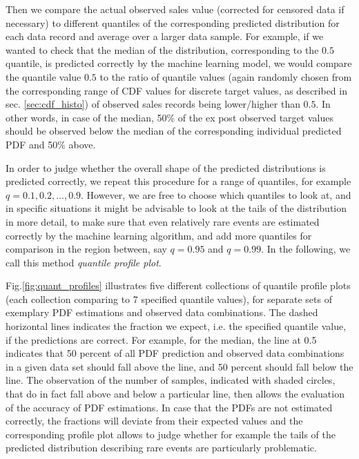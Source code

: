\documentclass[BCOR=1mm, DIV=calc,10pt,
twoside=true,
twocolumn,
headings=normal]{scrartcl}
\newcommand{\fig}{Fig.}
\begin{document}
Then we compare the actual observed sales value (corrected for censored data if necessary) to different quantiles of the corresponding predicted distribution for each data record and average over a larger data sample. For example, if we wanted to check that the median of the distribution, corresponding to the $0.5$ quantile, is predicted correctly by the machine learning model, we would compare the quantile value $0.5$ to the ratio of quantile values (again randomly chosen from the corresponding range of CDF values for discrete target values, as described in sec. \ref{sec:cdf_histo}) of observed sales records being lower/higher than $0.5$. In other words, in case of the median, 50\% of the ex post observed target values should be observed below the median of the corresponding individual predicted PDF and 50\% above.

In order to judge whether the overall shape of the predicted distributions is predicted correctly, we repeat this procedure for a range of quantiles, for example $q = 0.1, 0.2, \ldots, 0.9$. However, we are free to choose which quantiles to look at, and in specific situations it might be advisable to look at the tails of the distribution in more detail, to make sure that even relatively rare events are estimated correctly by the machine learning algorithm, and add more quantiles for comparison in the region between, say $q = 0.95$ and $q = 0.99$. In the following, we call this method {\em quantile profile plot}.

\fig \ref{fig:quant_profiles} illustrates five different collections of quantile profile plots (each collection comparing to 7 specified quantile values), for separate sets of exemplary PDF estimations and observed data combinations. The dashed horizontal lines indicates the fraction we expect, i.e. the specified quantile value, if the predictions are correct. For example, for the median, the line at 0.5 indicates that  50 percent of all PDF prediction and observed data combinations in a given data set should fall above the line, and 50 percent should fall below the line. The observation of the number of samples, indicated with shaded circles, that do in fact fall above and below a particular line, then allows the evaluation of the accuracy of PDF estimations. In case that the PDFs are not estimated correctly, the fractions will deviate from their expected values and the corresponding profile plot allows to judge whether for example the tails of the predicted distribution describing rare events are particularly problematic.
\end{document}
